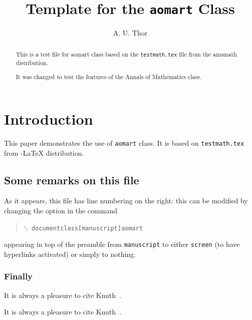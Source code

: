 \documentclass[manuscript]{aomart}
\title[Template]{Template for the \texttt{aomart}
  Class}
\author[A.T.]{A. U. Thor}
\begin{document}
\begin{abstract}
  This is a test file for \textsf{aomart} class based on the
  \texttt{testmath.tex} file from the \textsf{amsmath} distribution.  

  It was changed to test the features of the Annals of Mathematics
  class. 
\end{abstract}

\maketitle
\tableofcontents

\section{Introduction}


This paper demonstrates the use of \texttt{aomart} class.  It is based
on \texttt{testmath.tex} from  \AmS-\LaTeX{} distribution.  \subsection{Some remarks on this file}
As it appears, this file has line numbering on the right: this can be modified by changing the option in the command
\begin{quote}
\texttt{$\backslash$ documentclass[manuscript]{aomart}}
\end{quote}
appearing in top of the preamble from \texttt{manuscript} to either \texttt{screen} (to have hyperlinks activated) or simply to nothing.

\subsubsection{Finally}
It is always a pleasure to cite Knuth~\cite{Knuth94:TheTeXbook}.

It is always a pleasure to cite Knuth~\cite{Knuth94:TheTeXbook}.




\end{document}
